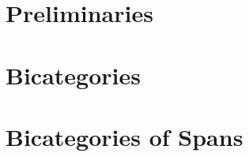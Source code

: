 \documentclass[11pt,notitlepage,a4paper]{report}
\begin{document}
{}
\chapter*{Preliminaries}



\chapter{Bicategories}
















\chapter{Bicategories of Spans}





{}



\end{document}
